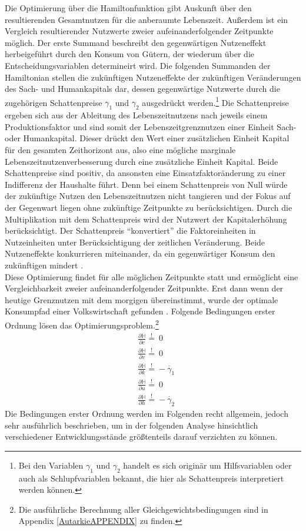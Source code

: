 Die Optimierung über die Hamiltonfunktion gibt Auskunft über den resultierenden Gesamtnutzen für die anberaumte Lebenszeit. Au{\ss}erdem ist ein Vergleich resultierender Nutzwerte zweier aufeinanderfolgender Zeitpunkte möglich. Der erste Summand beschreibt den gegenwärtigen Nutzeneffekt herbeigeführt durch den Konsum von Gütern, der wiederum über die Entscheidungsvariablen determineirt wird. Die folgenden Summanden der Hamiltonian stellen die zukünftigen Nutzeneffekte der zukünftigen Veränderungen des Sach- und Humankapitals dar, dessen gegenwärtige Nutzwerte durch die zugeh{\"o}rigen Schattenpreise $\gamma_1$ und $\gamma_2$ ausgedrückt werden.\footnote{Bei den Variablen $\gamma_1$ und $\gamma_2$ handelt es sich originär um Hilfsvariablen oder auch als Schlupfvariablen bekannt, die hier als Schattenpreis interpretiert werden können.} Die Schattenpreise ergeben sich aus der Ableitung des Lebenszeitnutzens nach jeweils einem Produktionsfaktor und sind somit der Lebenszeitgrenznutzen einer Einheit Sach- oder Humankapital. Dieser drückt den Wert einer zusätzlichen Einheit Kapital für den gesamten Zeithorizont aus, also eine mögliche marginale Lebenszeitnutzenverbesserung durch eine zusätzliche Einheit Kapital.  Beide Schattenpreise sind positiv, da ansonsten eine Einsatzfaktoränderung zu einer Indifferenz der Haushalte führt. Denn bei einem Schattenpreis von Null würde der zukünftige Nutzen den Lebenszeitnutzen nicht tangieren und der Fokus auf der Gegenwart liegen ohne zukünftige Zeitpunkte zu berücksichtigen. Durch die Multiplikation mit dem Schattenpreis wird der Nutzwert der Kapitalerhöhung berücksichtigt. Der Schattenpreis "`konvertiert"' die Faktoreinheiten in Nutzeinheiten unter Berücksichtigung der zeitlichen Veränderung. Beide Nutzeneffekte konkurrieren miteinander, da ein gegenwärtiger Konsum den zukünftigen mindert \citep{Chiang.2000,Chiang.2011}.\\   
Diese Optimierung findet für alle möglichen Zeitpunkte statt und ermöglicht eine Vergleichbarkeit zweier aufeinanderfolgender Zeitpunkte. Erst dann wenn der heutige Grenznutzen mit dem morgigen übereinstimmt, wurde der optimale Konsumpfad einer Volkswirtschaft gefunden \citep{Chiang.2000}. Folgende Bedingungen erster Ordnung lösen das Optimierungsproblem.\footnote{Die ausführliche Berechnung aller Gleichgewichtsbedingungen sind in Appendix \ref{AutarkieAPPENDIX} zu finden.}  
\begin{align}
&\frac{\partial\mathbb{H}}{\partial c}\overset{!}{=}~0\label{eq:foc1WM}\\
&\frac{\partial\mathbb{H}}{\partial v}\overset{!}{=}~0\label{eq:foc2WM}\\
&\frac{\partial\mathbb{H}}{\partial k}\overset{!}{=}-\dot{\gamma_1}\label{eq:foc3WM}\\
&\frac{\partial\mathbb{H}}{\partial u}\overset{!}{=}~0\label{eq:foc4WM}\\
&\frac{\partial\mathbb{H}}{\partial h}\overset{!}{=}-\dot{\gamma_2}\label{eq:foc5WM}\end{align}
Die Bedingungen erster Ordnung werden im Folgenden recht allgemein, jedoch sehr ausführlich beschrieben, um in der folgenden Analyse hinsichtlich verschiedener Entwicklungsstände grö{\ss}tenteils darauf verzichten zu können. 
